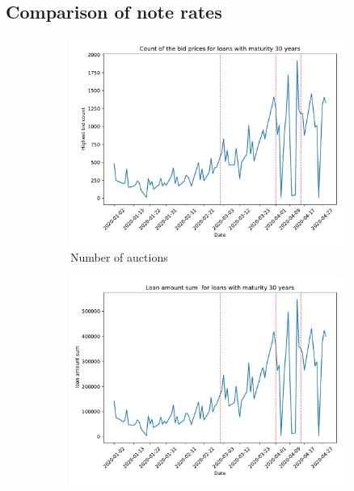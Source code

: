 \documentclass[11pt,a4paper]{article}
\begin{document}
\subsection{Comparison of note rates}

\begin{figure}[h]
  \centering
  \begin{subfigure}[b]{0.49\textwidth}
      \includegraphics[width=0.998\textwidth]{../results/figures/winner_bid_count_mat30_loan1_timeseries_nr_3_3.75.pdf}
      \caption{ Number of auctions}
     \end{subfigure}
     \begin{subfigure}[b]{0.49\textwidth}
      \includegraphics[width=0.998\textwidth]{../results/figures/LoanAmount_sum_mat30_loan1_timeseries_nr_3_3.75.pdf}

\end{subfigure}
\end{figure}
\end{document}
